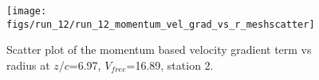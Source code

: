 \begin{figure}[H]
\centering
\texttt{[image: figs/run\_12/run\_12\_momentum\_vel\_grad\_vs\_r\_meshscatter]}
\caption{Scatter plot of the momentum based velocity gradient term vs radius at $z/c$=6.97, $V_{free}$=16.89, station 2.}
\label{fig:run_12_momentum_vel_grad_vs_r_meshscatter}
\end{figure}


